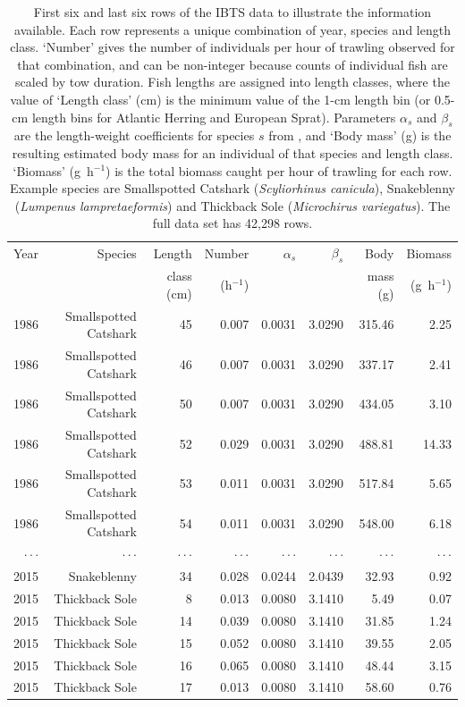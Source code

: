 \begin{table}[tp]
\centering
\caption{First six and last six rows of the IBTS data to illustrate the
  information available. Each row represents a unique combination of year,
  species and length class. `Number' gives the number of individuals per hour of
  trawling observed for that combination, and can be non-integer because counts
  of individual fish are scaled by tow duration. Fish lengths are assigned into
  length classes, where the value of `Length class' (cm) is the minimum value of
  the 1-cm length bin (or 0.5-cm length bins for Atlantic Herring and European
  Sprat). Parameters $\alpha_s$ and $\beta_s$ are the length-weight coefficients
  for species $s$ from \citet{ffrr12}, and `Body mass' (g) is the resulting
  estimated body mass for an individual of that species and length
  class. `Biomass' (g~h$^{-1}$) is the total biomass caught per hour of trawling
  for each row. Example species are Smallspotted Catshark ({\it Scyliorhinus
    canicula}), Snakeblenny ({\it Lumpenus lampretaeformis}) and Thickback Sole
  ({\it Microchirus variegatus}). The full data set has 42,298 rows.}
\label{tab:egData}
\begin{tabular}{rrrrrrrr}
  \hline
  Year & Species & Length & Number & $\alpha_s$ & $\beta_s$ & Body & Biomass\\
       & & class (cm) & (h$^{-1}$) & & & mass (g) & (g~h$^{-1}$) \\
  \hline
  1986 & Smallspotted Catshark & 45 & 0.007 & 0.0031 & 3.0290 & 315.46 & 2.25 \\
  1986 & Smallspotted Catshark & 46 & 0.007 & 0.0031 & 3.0290 & 337.17 & 2.41 \\
  1986 & Smallspotted Catshark & 50 & 0.007 & 0.0031 & 3.0290 & 434.05 & 3.10 \\
  1986 & Smallspotted Catshark & 52 & 0.029 & 0.0031 & 3.0290 & 488.81 & 14.33 \\
  1986 & Smallspotted Catshark & 53 & 0.011 & 0.0031 & 3.0290 & 517.84 & 5.65 \\
  1986 & Smallspotted Catshark & 54 & 0.011 & 0.0031 & 3.0290 & 548.00 & 6.18 \\
  $\cdot \cdot \cdot$ & $\cdot \cdot \cdot$ & $\cdot
  \cdot \cdot$ & $\cdot \cdot \cdot$ & $\cdot \cdot \cdot$ & $\cdot \cdot \cdot$
               & $\cdot \cdot \cdot$ & $\cdot \cdot \cdot$ \\
  2015 & Snakeblenny & 34 & 0.028 & 0.0244 & 2.0439 & 32.93 & 0.92 \\
  2015 & Thickback Sole & 8 & 0.013 & 0.0080 & 3.1410 & 5.49 & 0.07 \\
  2015 & Thickback Sole & 14 & 0.039 & 0.0080 & 3.1410 & 31.85 & 1.24 \\
  2015 & Thickback Sole & 15 & 0.052 & 0.0080 & 3.1410 & 39.55 & 2.05 \\
  2015 & Thickback Sole & 16 & 0.065 & 0.0080 & 3.1410 & 48.44 & 3.15 \\
  2015 & Thickback Sole & 17 & 0.013 & 0.0080 & 3.1410 & 58.60 & 0.76 \\
  \hline
\end{tabular}
\end{table}

